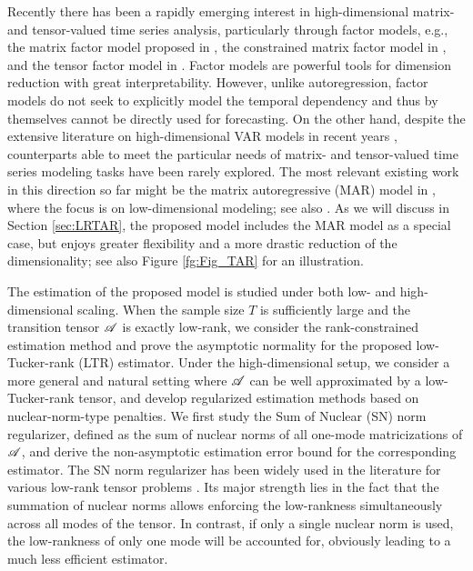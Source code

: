 \documentclass[12pt]{article}
\newcommand{\cm}[1]{\mbox{\boldmath$\mathscr{#1}$}}
\begin{document}
Recently there has been a rapidly emerging interest in high-dimensional matrix- and tensor-valued time series analysis, particularly through factor models, e.g., the matrix factor model proposed in \cite{wang2016factor}, the constrained matrix factor model in \citet{chen2017constrained}, and the tensor factor model in \cite{chen2019factor}. Factor models are powerful tools for dimension reduction  with great interpretability. However, unlike autoregression, factor models do not seek to  explicitly model the temporal dependency and thus by themselves cannot be directly used for forecasting.  On the other hand, despite the extensive literature on high-dimensional VAR models in recent years \citep[e.g.][]{negahban2011estimation, basu2015regularized, han2015direct, wang2019high, zheng20}, counterparts able to meet the particular needs of matrix- and tensor-valued time series modeling tasks have  been rarely explored. The most relevant existing work in this direction so far might be the matrix autoregressive (MAR) model in  \cite{chen2018autoregressive}, where the focus is on low-dimensional modeling; see also \cite{hoff15}. As we will discuss in Section \ref{sec:LRTAR}, the proposed model includes the MAR model as a special case, but enjoys greater flexibility and a more drastic reduction of the dimensionality; see also Figure \ref{fg:Fig_TAR} for an illustration.

The estimation of the proposed model is studied under both low- and high-dimensional scaling. When the sample size $T$ is sufficiently large and the transition tensor $\cm{A}$ is exactly low-rank, we consider the rank-constrained estimation method and prove the  asymptotic normality for the proposed low-Tucker-rank (LTR) estimator. Under the high-dimensional setup, we  consider a more general and natural setting where $\cm{A}$ can be well approximated by a low-Tucker-rank tensor, and develop regularized estimation methods based on nuclear-norm-type penalties.  We first study the Sum of Nuclear (SN) norm regularizer, defined as the sum of nuclear norms of all one-mode matricizations of  $\cm{A}$, and derive the non-asymptotic estimation error bound for the corresponding estimator. The SN norm regularizer has been widely used in the literature for various low-rank tensor problems  \citep{gandy2011tensor, tomioka2011statistical, liu2013tensor, raskutti2019convex}. Its major strength lies in the fact that the summation of nuclear norms allows enforcing the low-rankness simultaneously across all modes of the tensor.  In contrast, if only a single nuclear norm is used,  the low-rankness of only  one mode will be accounted for, obviously leading to a much less efficient estimator.
\end{document}
